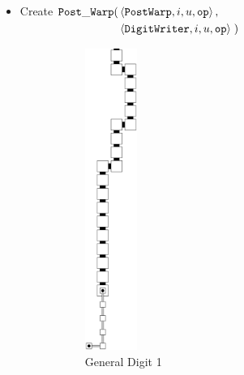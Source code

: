\begin{itemize}
        \item
        Create
        $\begin{aligned}[t]
            {\tt Post\_Warp}(& \left \langle {\tt PostWarp},    i, u, {\tt op} \right\rangle, \\
                      & \left \langle {\tt DigitWriter}, i, u, {\tt op} \right\rangle \;)
        \end{aligned}$

        \begin{figure}[H]
            \begin{subfigure}[t]{0.2\textwidth}
                \centering
                \includegraphics[width=0.2\textwidth]{warping/post_warp_general_digit1}
                \caption{\label{fig:warping/post_warp_general_digit1} General Digit 1}
            \end{subfigure}%
            ~
            \begin{subfigure}[t]{0.2\textwidth}
                \centering

\end{subfigure}
\end{figure}
\end{itemize}
